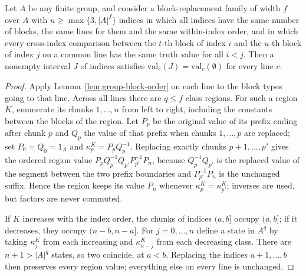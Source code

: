 \begin{lemma}
\label{lem:group-interval}
Let $A$ be any finite group, and consider a block-replacement family of width
$f$ over $A$ with $n\ge\max\{3,|A|^f\}$ indices in which all indices have the
same number of blocks, the same lines for them and the same within-index
order, and in which every cross-index comparison between the $t$-th block of
index $i$ and the $u$-th block of index $j$ on a common line has the same
truth value for all $i<j$.  Then a nonempty interval $J$ of indices satisfies
$\mathrm{val}_c(J)=\mathrm{val}_c(\emptyset)$ for every line $c$.
\end{lemma}
\begin{proof}
Apply Lemma~\ref{lem:group-block-order} on each line to the block types going
to that line.  Across all lines there are $q\le f$ class regions.  For such a
region $K$, enumerate its chunks $1,\ldots,n$ from left to right, including
the constants between the blocks of the region.  Let $P_p$ be the original
value of its prefix ending after chunk $p$ and $Q_p$ the value of that prefix
when chunks $1,\ldots,p$ are replaced; set $P_0=Q_0=1_A$ and
$\kappa^K_p=P_pQ_p^{-1}$.  Replacing exactly chunks $p+1,\ldots,p'$ gives the
ordered region value $P_pQ_p^{-1}Q_{p'}P_{p'}^{-1}P_n$, because
$Q_p^{-1}Q_{p'}$ is the replaced value of the segment between the two prefix
boundaries and $P_{p'}^{-1}P_n$ is the unchanged suffix.  Hence the region
keeps its value $P_n$ whenever $\kappa^K_p=\kappa^K_{p'}$; inverses are used,
but factors are never commuted.

If $K$ increases with the index order, the chunks of indices $(a,b]$ occupy
$(a,b]$; if it decreases, they occupy $(n-b,n-a]$.  For $j=0,\ldots,n$ define
a state in $A^q$ by taking $\kappa^K_j$ from each increasing and
$\kappa^K_{n-j}$ from each decreasing class.  There are $n+1>|A|^q$ states, so
two coincide, at $a<b$.  Replacing the indices $a+1,\ldots,b$ then preserves
every region value; everything else on every line is unchanged.
\end{proof}

